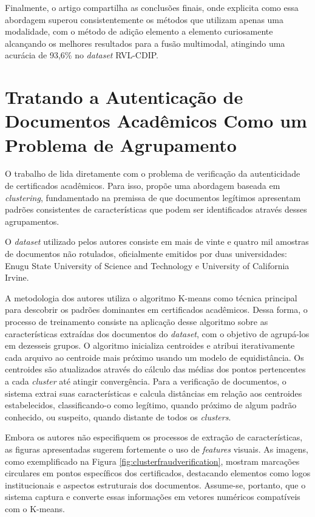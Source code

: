 Finalmente, o artigo compartilha as conclusões finais, onde explicita como essa abordagem superou consistentemente os métodos que utilizam apenas uma modalidade, com o método de adição elemento a elemento curiosamente alcançando os melhores resultados para a fusão multimodal, atingindo uma acurácia de 93,6\% no \textit{dataset} RVL-CDIP.

\section{Tratando a Autenticação de Documentos Acadêmicos Como um Problema de Agrupamento}

O trabalho de \citeauthor*{clusterfraudverification} \cite*{clusterfraudverification} lida diretamente com o problema de verificação da autenticidade de certificados acadêmicos. Para isso, propõe uma abordagem baseada em \textit{clustering}, fundamentado na premissa de que documentos legítimos apresentam padrões consistentes de características que podem ser identificados através desses agrupamentos.

O \textit{dataset} utilizado pelos autores consiste em mais de vinte e quatro mil amostras de documentos não rotulados, oficialmente emitidos por duas universidades: Enugu State University of Science and Technology e University of California Irvine.

A metodologia dos autores utiliza o algoritmo K-means como técnica principal para descobrir os padrões dominantes em certificados acadêmicos. Dessa forma, o processo de treinamento consiste na aplicação desse algoritmo sobre as características extraídas dos documentos do \textit{dataset}, com o objetivo de agrupá-los em dezesseis grupos. O algoritmo inicializa centroides e atribui iterativamente cada arquivo ao centroide mais próximo usando um modelo de equidistância. Os centroides são atualizados através do cálculo das médias dos pontos pertencentes a cada \textit{cluster} até atingir convergência. Para a verificação de documentos, o sistema extrai suas características e calcula distâncias em relação aos centroides estabelecidos, classificando-o como legítimo, quando próximo de algum padrão conhecido, ou suspeito, quando distante de todos os \textit{clusters}.

Embora os autores não especifiquem os processos de extração de características, as figuras apresentadas sugerem fortemente o uso de \textit{features} visuais. As imagens, como exemplificado na Figura \ref{fig:clusterfraudverification}, mostram marcações circulares em pontos específicos dos certificados, destacando elementos como logos institucionais e aspectos estruturais dos documentos. Assume-se, portanto, que o sistema captura e converte essas informações em vetores numéricos compatíveis com o K-means.

